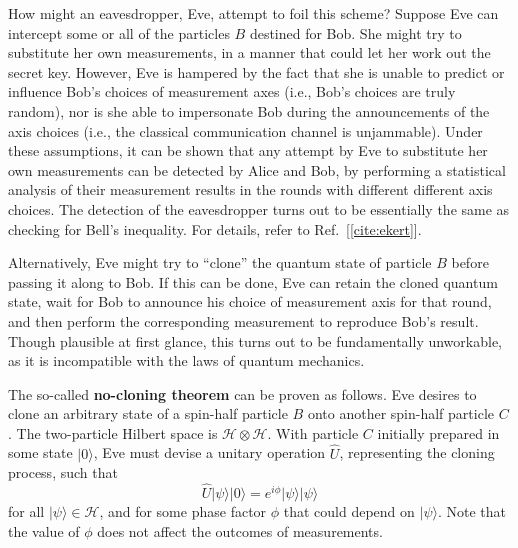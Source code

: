 \documentclass[pra,12pt]{revtex4}
\begin{document}
How might an eavesdropper, Eve, attempt to foil this scheme?  Suppose
Eve can intercept some or all of the particles $B$ destined for Bob.
She might try to substitute her own measurements, in a manner that
could let her work out the secret key.  However, Eve is hampered by
the fact that she is unable to predict or influence Bob's choices of
measurement axes (i.e., Bob's choices are truly random), nor is she
able to impersonate Bob during the announcements of the axis choices
(i.e., the classical communication channel is unjammable).  Under
these assumptions, it can be shown that any attempt by Eve to
substitute her own measurements can be detected by Alice and Bob, by
performing a statistical analysis of their measurement results in the
rounds with different different axis choices.  The detection of the
eavesdropper turns out to be essentially the same as checking for
Bell's inequality.  For details, refer to Ref.~[\ref{cite:ekert}].

Alternatively, Eve might try to ``clone'' the quantum state of
particle $B$ before passing it along to Bob.  If this can be done, Eve
can retain the cloned quantum state, wait for Bob to announce his
choice of measurement axis for that round, and then perform the
corresponding measurement to reproduce Bob's result.  Though plausible
at first glance, this turns out to be fundamentally unworkable, as it
is incompatible with the laws of quantum mechanics.

The so-called \textbf{no-cloning theorem} can be proven as follows.
Eve desires to clone an arbitrary state of a spin-half particle $B$
onto another spin-half particle $C$.  The two-particle Hilbert space
is $\mathscr{H}\otimes\mathscr{H}$.  With particle $C$ initially
prepared in some state $|0\rangle$, Eve must devise a unitary
operation $\hat{U}$, representing the cloning process, such that
\begin{equation}
  \hat{U} |\psi\rangle | 0\rangle = e^{i\phi} |\psi\rangle |\psi\rangle
  \label{clone}
\end{equation}
for all $|\psi\rangle \in \mathscr{H}$, and for some phase factor
$\phi$ that could depend on $|\psi\rangle$.  Note that the value of
$\phi$ does not affect the outcomes of measurements.
\end{document}
